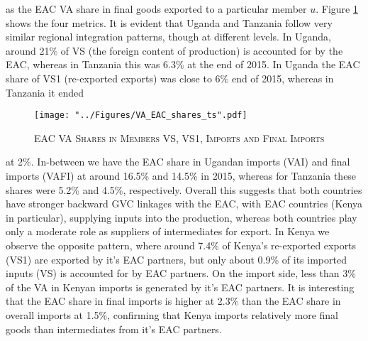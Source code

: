 \documentclass[a4paper]{article}
\begin{document}
as the EAC VA share in final goods exported to a particular member $u$. 
%
%
%
%
%
Figure \ref{fig:VAEACshares} shows the four metrics. It is evident that Uganda and Tanzania follow very similar regional integration patterns, though at different levels. In Uganda, around 21\% of VS (the foreign content of production) is accounted for by the EAC, whereas in Tanzania this was 6.3\% at the end of 2015. In Uganda the EAC share of VS1 (re-exported exports) was close to 6\% end of 2015, whereas in Tanzania it ended 

\begin{figure}[h!]
\centering
\caption{\label{fig:VAEACshares}\textsc{EAC VA Shares in Members VS, VS1, Imports and Final Imports}}
\texttt{[image: "../Figures/VA\_EAC\_shares\_ts".pdf]} %
\end{figure}
\FloatBarrier

\noindent at 2\%. In-between we have the EAC share in Ugandan imports (VAI) and final imports (VAFI) at around 16.5\% and 14.5\% in 2015, whereas for Tanzania these shares were 5.2\% and 4.5\%, respectively. Overall this suggests that both countries have stronger backward GVC linkages with the EAC, with EAC countries (Kenya in particular), supplying inputs into the production, whereas both countries play only a moderate role as suppliers of intermediates for export. In Kenya we observe the opposite pattern, where around 7.4\% of Kenya's re-exported exports (VS1) are exported by it's EAC partners, but only about 0.9\% of its imported inputs (VS) is accounted for by EAC partners. On the import side, less than 3\% of the VA in Kenyan imports is generated by it's EAC partners. It is interesting that the EAC share in final imports is higher at 2.3\% than the EAC share in overall imports at 1.5\%, confirming that Kenya imports relatively more final goods than intermediates from it's EAC partners. \newline
\end{document}
